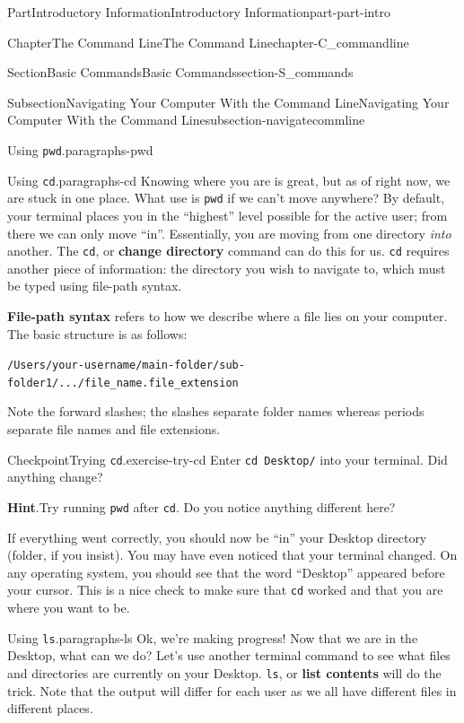 \documentclass[twoside,10pt,]{book}
\newcommand{\blocktitlefont}{\relax}
\newcommand{\mono}[1]{\texttt{#1}}
\newcommand{\terminology}[1]{\textbf{#1}}
\begin{document}
\begin{partptx}{Part}{Introductory Information}{}{Introductory Information}{}{}{part-part-intro}
\begin{chapterptx}{Chapter}{The Command Line}{}{The Command Line}{}{}{chapter-C_commandline}
\begin{sectionptx}{Section}{Basic Commands}{}{Basic Commands}{}{}{section-S_commands}
\begin{subsectionptx}{Subsection}{Navigating Your Computer With the Command Line}{}{Navigating Your Computer With the Command Line}{}{}{subsection-navigatecommline}
\begin{paragraphs}{Using \mono{pwd}.}{paragraphs-pwd}
\end{paragraphs}%
\begin{paragraphs}{Using \mono{cd}.}{paragraphs-cd}%
\index{\mono{cd}}%
%
%
%
\index{command line!\mono{cd}}%
Knowing where you are is great, but as of right now, we are stuck in one place. What use is \mono{pwd} if we can't move anywhere? By default, your terminal places you in the ``highest'' level possible for the active user; from there we can only move ``in''. Essentially, you are moving from one directory \emph{into} another. The \mono{cd}, or \terminology{change directory} command can do this for us. \mono{cd} requires another piece of information: the directory you wish to navigate to, which must be typed using file-path syntax.%
\par
\terminology{File-path syntax} refers to how we describe where a file lies on your computer. The basic structure is as follows:%
\par
\mono{/Users/your-username/main-folder/sub-folder1/.../file\_name.file\_extension}%
\par
Note the forward slashes; the slashes separate folder names whereas periods separate file names and file extensions.%
\begin{inlineexercise}{Checkpoint}{Trying \mono{cd}.}{exercise-try-cd}%
Enter \mono{cd Desktop/} into your terminal. Did anything change?%
\par\smallskip%
\noindent\textbf{\blocktitlefont Hint}.\label{hint-try-cd-c}{}\hypertarget{hint-try-cd-c}{}\quad{}Try running \mono{pwd} after \mono{cd}. Do you notice anything different here?%
\end{inlineexercise}%
If everything went correctly, you should now be ``in'' your Desktop directory (folder, if you insist). You may have even noticed that your terminal changed. On any operating system, you should see that the word ``Desktop'' appeared before your cursor. This is a nice check to make sure that \mono{cd} worked and that you are where you want to be.%
\end{paragraphs}%
\begin{paragraphs}{Using \mono{ls}.}{paragraphs-ls}%
\index{command line!\mono{ls}}%
\index{\mono{ls}}%
%
Ok, we're making progress! Now that we are in the Desktop, what can we do? Let's use another terminal command to see what files and directories are currently on your Desktop. \mono{ls}, or \terminology{list contents} will do the trick. Note that the output will differ for each user as we all have different files in different places.%

\end{paragraphs}
\end{subsectionptx}
\end{sectionptx}
\end{chapterptx}
\end{partptx}
\end{document}
